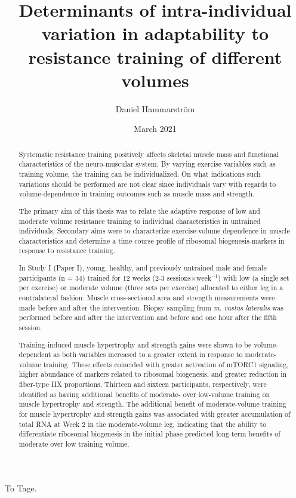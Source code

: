 \documentclass[twoside,10pt]{gihclass} %
\title{Determinants of intra-individual variation in adaptability to resistance training of different volumes}
\author{Daniel Hammarström}
\date{March 2021}
\begin{document}


\frontmatter %
  \maketitle
  \begin{dedication}
\vspace*{\fill}
 To Tage.
\vspace*{\fill}
  \end{dedication}



  \begin{abstract}
    Systematic resistance training positively affects skeletal muscle mass and functional characteristics of the neuro-muscular system. By varying exercise variables such as training volume, the training can be individualized. On what indications such variations should be performed are not clear since individuals vary with regards to volume-dependence in training outcomes such as muscle mass and strength.

    The primary aim of this thesis was to relate the adaptive response of low and moderate volume resistance training to individual characteristics in untrained individuals.
    Secondary aims were to characterize exercise-volume dependence in muscle characteristics and determine a time course profile of ribosomal biogenesis-markers in response to resistance training.

    In Study I (Paper I), young, healthy, and previously untrained male and female participants (n = 34) trained for 12 weeks (2-3 sessions\(\times\)week\(^{-1}\)) with low (a single set per exercise) or moderate volume (three sets per exercise) allocated to either leg in a contralateral fashion.
    Muscle cross-sectional area and strength measurements were made before and after the intervention. Biopsy sampling from \emph{m. vastus lateralis} was performed before and after the intervention and before and one hour after the fifth session.

    Training-induced muscle hypertrophy and strength gains were shown to be volume-dependent as both variables increased to a greater extent in response to moderate-volume training. These effects coincided with greater activation of mTORC1 signaling, higher abundance of markers related to ribosomal biogenesis, and greater reduction in fiber-type IIX proportions. Thirteen and sixteen participants, respectively, were identified as having additional benefits of moderate- over low-volume training on muscle hypertrophy and strength. The additional benefit of moderate-volume training for muscle hypertrophy and strength gains was associated with greater accumulation of total RNA at Week 2 in the moderate-volume leg, indicating that the ability to differentiate ribosomal biogenesis in the initial phase predicted long-term benefits of moderate over low training volume.


\end{abstract}
\end{document}

